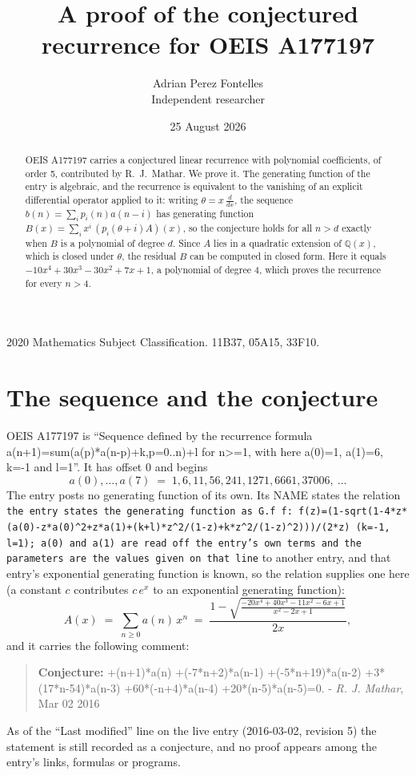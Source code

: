 \documentclass[11pt,a4paper]{article}
\title{A proof of the conjectured recurrence for OEIS A177197}
\author{Adrian Perez Fontelles\\ \small Independent researcher}
\date{25 August 2026}
\theoremstyle{plain}
\theoremstyle{definition}
\begin{document}
\maketitle

\begin{abstract}
OEIS A177197 carries a conjectured linear recurrence with polynomial coefficients, of
order 5, contributed by R.~J.~Mathar. We prove it. The generating function of the
entry is algebraic, and the recurrence is equivalent to the vanishing of an explicit
differential operator applied to it: writing $\theta=x\,\frac{d}{dx}$, the sequence
$b(n)=\sum_{i}p_{i}(n)a(n-i)$ has generating function
$B(x)=\sum_{i}x^{i}\,(p_{i}(\theta+i)A)(x)$, so the conjecture holds for all $n>d$ exactly
when $B$ is a polynomial of degree $d$. Since $A$ lies in a quadratic extension of
$\mathbb{Q}(x)$, which is closed under $\theta$, the residual $B$ can be computed in
closed form. Here it equals $- 10 x^{4} + 30 x^{3} - 30 x^{2} + 7 x + 1$, a polynomial of degree $4$, which proves
the recurrence for every $n>4$.
\end{abstract}

\noindent\small 2020 Mathematics Subject Classification. 11B37, 05A15, 33F10.\normalsize

\section{The sequence and the conjecture}

OEIS A177197 is ``Sequence defined by the recurrence formula a(n+1)=sum(a(p)*a(n-p)+k,p=0..n)+l for n>=1, with here a(0)=1, a(1)=6, k=-1 and l=1''. It has offset $0$ and begins
\[
a(0),\dots,a(7)\;=\;1, 6, 11, 56, 241, 1271, 6661, 37006,\ \dots
\]
The entry posts no generating function of its own. Its NAME states the
relation \texttt{the entry states the generating function as G.f f: f(z)=(1-sqrt(1-4*z*(a(0)-z*a(0)\textasciicircum{}2+z*a(1)+(k+l)*z\textasciicircum{}2/(1-z)+k*z\textasciicircum{}2/(1-z)\textasciicircum{}2)))/(2*z) (k=-1, l=1); a(0) and a(1) are read off the entry's own terms and the parameters are the values given on that line} to another entry, and that entry's exponential generating
function is known, so the relation supplies one here (a constant $c$ contributes
$c\,e^{x}$ to an exponential generating function):
\begin{equation}\label{eq:gf}
A(x)\;=\;\sum_{n\ge 0} a(n)\,x^{n}\;=\;\frac{1 - \sqrt{\frac{- 20 x^{4} + 40 x^{3} - 11 x^{2} - 6 x + 1}{x^{2} - 2 x + 1}}}{2 x} ,
\end{equation}
and it carries the following comment:
\begin{quote}\small
\textbf{Conjecture:} +(n+1)*a(n) +(-7*n+2)*a(n-1) +(-5*n+19)*a(n-2) +3*(17*n-54)*a(n-3) +60*(-n+4)*a(n-4) +20*(n-5)*a(n-5)=0. - \emph{R. J. Mathar}, Mar 02 2016
\end{quote}
As of the ``Last modified'' line on the live entry (2016-03-02, revision 5) the
statement is still recorded as a conjecture, and no proof appears among the entry's links,
formulas or programs.
\end{document}
